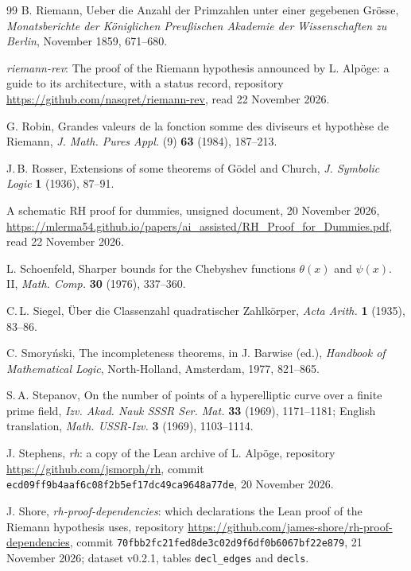 \documentclass[11pt]{article}
\theoremstyle{definition}
\theoremstyle{remark}
\begin{document}
\begin{thebibliography}{99}
 B. Riemann, Ueber die Anzahl der Primzahlen unter einer gegebenen Gr\"osse, \emph{Monatsberichte der K\"oniglichen Preu\ss ischen Akademie der Wissenschaften zu Berlin}, November 1859, 671--680.

 \emph{riemann-rev}: The proof of the Riemann hypothesis announced by L. Alp\"oge: a guide to its architecture, with a status record, repository \url{https://github.com/nasqret/riemann-rev}, read 22 November 2026.

 G. Robin, Grandes valeurs de la fonction somme des diviseurs et hypoth\`ese de Riemann, \emph{J. Math. Pures Appl.} (9) \textbf{63} (1984), 187--213.

 J.\,B. Rosser, Extensions of some theorems of G\"odel and Church, \emph{J. Symbolic Logic} \textbf{1} (1936), 87--91.

 A schematic RH proof for dummies, unsigned document, 20 November 2026, \url{https://mlerma54.github.io/papers/ai_assisted/RH_Proof_for_Dummies.pdf}, read 22 November 2026.

 L. Schoenfeld, Sharper bounds for the Chebyshev functions $\theta(x)$ and $\psi(x)$. II, \emph{Math. Comp.} \textbf{30} (1976), 337--360.

 C.\,L. Siegel, \"Uber die Classenzahl quadratischer Zahlk\"orper, \emph{Acta Arith.} \textbf{1} (1935), 83--86.

 C. Smory\'nski, The incompleteness theorems, in J. Barwise (ed.), \emph{Handbook of Mathematical Logic}, North-Holland, Amsterdam, 1977, 821--865.

 S.\,A. Stepanov, On the number of points of a hyperelliptic curve over a finite prime field, \emph{Izv. Akad. Nauk SSSR Ser. Mat.} \textbf{33} (1969), 1171--1181; English translation, \emph{Math. USSR-Izv.} \textbf{3} (1969), 1103--1114.

 J. Stephens, \emph{rh}: a copy of the Lean archive of L. Alp\"oge, repository \url{https://github.com/jsmorph/rh}, commit \nolinkurl{ecd09ff9b4aaf6c08f2b5ef17dc49ca9648a77de}, 20 November 2026.

 J. Shore, \emph{rh-proof-dependencies}: which declarations the Lean proof of the Riemann hypothesis uses, repository \url{https://github.com/james-shore/rh-proof-dependencies}, commit \nolinkurl{70fbb2fc21fed8de3c02d9f6df0b6067bf22e879}, 21 November 2026; dataset v0.2.1, tables \nolinkurl{decl_edges} and \nolinkurl{decls}.


\end{thebibliography}
\end{document}
